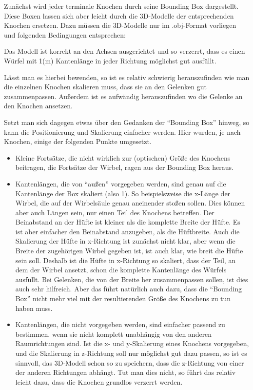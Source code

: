 Zunächst wird jeder terminale Knochen durch seine Bounding Box dargestellt.
Diese Boxen lassen sich aber leicht durch die 3D-Modelle der entsprechenden Knochen ersetzen. Dazu müssen die 3D-Modelle nur im .obj-Format vorliegen und folgenden Bedingungen entsprechen:

Das Modell ist korrekt an den Achsen ausgerichtet und so verzerrt, dass es einen Würfel mit 1(m) Kantenlänge in jeder Richtung möglichst gut ausfüllt.

Lässt man es hierbei bewenden, so ist es relativ schwierig herauszufinden wie man die einzelnen Knochen skalieren muss, dass sie an den Gelenken gut zusammenpassen. Außerdem ist es aufwändig herauszufinden wo die Gelenke an den Knochen ansetzen.

Setzt man sich dagegen etwas über den Gedanken der "`Bounding Box"' hinweg, so kann die Positionierung und Skalierung einfacher werden. Hier wurden, je nach Knochen, einige der folgenden Punkte umgesetzt. 
\begin{itemize}
 \item Kleine Fortsätze, die nicht wirklich zur (optischen) Größe des Knochens beitragen, \zb die Fortsätze der Wirbel, ragen aus der Bounding Box heraus.
 
 \item Kantenlängen, die von "`außen"' vorgegeben werden, sind genau auf die Kantenlänge der Box skaliert (also 1). So beispielsweise die x-Länge der Wirbel, die auf der Wirbelsäule genau aneinender stoßen sollen. Dies können aber auch Längen sein, nur einen Teil des Knochens betreffen. Der Beinabstand an der Hüfte ist \zb kleiner als die komplette Breite der Hüfte. Es ist aber einfacher den Beinabstand anzugeben, als die Hüftbreite. Auch die Skalierung der Hüfte in x-Richtung ist zunächst nicht klar, aber wenn die Breite der zugehörigen Wirbel gegeben ist, ist auch klar, wie breit die Hüfte sein soll. Deshalb ist die Hüfte in x-Richtung so skaliert, dass der Teil, an dem der Wirbel ansetzt, schon die komplette Kantenlänge des Würfels ausfüllt. Bei Gelenken, die von der Breite her zusammenpassen sollen, ist dies auch sehr hilfreich. Aber das führt natürlich auch dazu, dass die "`Bounding Box"' nicht mehr viel mit der resultierenden Größe des Knochens zu tun haben muss.
 
 \item Kantenlängen, die nicht vorgegeben werden, sind einfacher passend zu bestimmen, wenn sie nicht komplett unabhängig von den anderen Raumrichtungen sind. Ist \zb die x- und y-Skalierung eines Knochens vorgegeben, und die Skalierung in z-Richtung soll nur möglichst gut dazu passen, so ist es sinnvoll, das 3D-Modell schon so zu speichern, dass die z-Richtung von einer der anderen Richtungen abhängt. Tut man dies nicht, so führt das relativ leicht dazu, dass die Knochen grundlos verzerrt werden.
\end{itemize}

